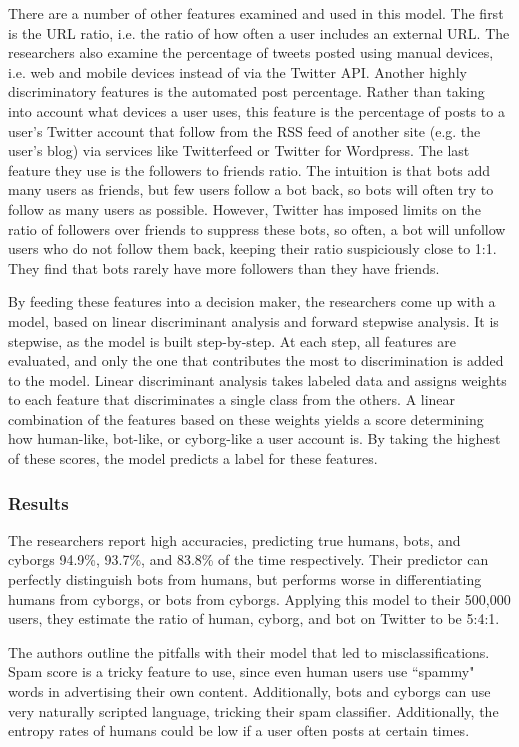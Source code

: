\documentclass[11pt, oneside]{article}   	%
\begin{document}
\quad There are a number of other features examined and used in this model.
The first is the URL ratio, i.e. the ratio of how often a user includes an external URL.
The researchers also examine the percentage of tweets posted using manual devices, i.e. web and mobile devices instead of via the Twitter API.
Another highly discriminatory features is the automated post percentage.
Rather than taking into account what devices a user uses, this feature is the percentage of posts to a user's Twitter account that follow from the RSS feed of another site (e.g. the user's blog) via services like Twitterfeed or Twitter for Wordpress.
The last feature they use is the followers to friends ratio.
The intuition is that bots add many users as friends, but few users follow a bot back, so bots will often try to follow as many users as possible.
However, Twitter has imposed limits on the ratio of followers over friends to suppress these bots, so often, a bot will unfollow users who do not follow them back, keeping their ratio suspiciously close to 1:1.
They find that bots rarely have more followers than they have friends.

\quad By feeding these features into a decision maker, the researchers come up with a model, based on linear discriminant analysis and forward stepwise analysis.
It is stepwise, as the model is built step-by-step.
At each step, all features are evaluated, and only the one that contributes the most to discrimination is added to the model.
Linear discriminant analysis takes labeled data and assigns weights to each feature that discriminates a single class from the others.
A linear combination of the features based on these weights yields a score determining how human-like, bot-like, or cyborg-like a user account is.
By taking the highest of these scores, the model predicts a label for these features.

\subsubsection*{Results}

\quad The researchers report high accuracies, predicting true humans, bots, and cyborgs 94.9\%, 93.7\%, and 83.8\% of the time respectively.
Their predictor can perfectly distinguish bots from humans, but performs worse in differentiating humans from cyborgs, or bots from cyborgs.
Applying this model to their 500,000 users, they estimate the ratio of human, cyborg, and bot on Twitter to be 5:4:1.

\quad The authors outline the pitfalls with their model that led to misclassifications.
Spam score is a tricky feature to use, since even human users use ``spammy" words in advertising their own content.
Additionally, bots and cyborgs can use very naturally scripted language, tricking their spam classifier.
Additionally, the entropy rates of humans could be low if a user often posts at certain times.
\end{document}
